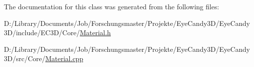 The documentation for this class was generated from the following files\+:\begin{DoxyCompactItemize}
\item 
D\+:/\+Library/\+Documents/\+Job/\+Forschungsmaster/\+Projekte/\+Eye\+Candy3\+D/\+Eye\+Candy3\+D/include/\+E\+C3\+D/\+Core/\mbox{\hyperlink{_material_8h}{Material.\+h}}\item 
D\+:/\+Library/\+Documents/\+Job/\+Forschungsmaster/\+Projekte/\+Eye\+Candy3\+D/\+Eye\+Candy3\+D/src/\+Core/\mbox{\hyperlink{_material_8cpp}{Material.\+cpp}}\end{DoxyCompactItemize}
